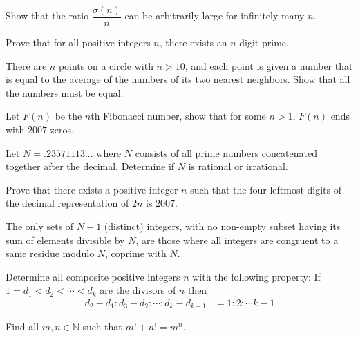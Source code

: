 \documentclass[problems.tex]{subfile}
\begin{document}
	\begin{problem}
		Show that the ratio $\dfrac{\sigma(n)}{n}$ can be arbitrarily large for infinitely many $n$\watermark.
	\end{problem}

	\begin{problem}
		Prove that for all positive integers $n$, there exists an $n$-digit prime.
	\end{problem}
	
	\begin{problem}
		There are $n$ points on a circle with $n>10$, and each point is given a number that is equal to the average of the numbers of its two nearest neighbors. Show that all the numbers must be equal.
	\end{problem}
	
	\begin{problem}
		Let $F(n)$ be the $n$th Fibonacci number, show that for some $n>1$, $F(n)$ ends with $2007$ zeros.
	\end{problem}
	
	\begin{problem}
		Let $N=.23571113...$ where $N$ consists of all prime numbers concatenated together after the decimal. Determine if $N$ is rational or irrational.
	\end{problem}
	
	\begin{problem}
		Prove that there exists a positive integer $n$ such that the four leftmost digits of the decimal representation of $2n$ is $2007$.
	\end{problem}
	
	\begin{problem}
		The only sets of $N-1$ (distinct) integers, with no non-empty subset having its sum of elements divisible by $N$, are those where all integers are congruent to a same residue modulo $N$, coprime with $N$.
	\end{problem}
	
	\begin{problem}
		Determine all composite positive integers $n$ with the following property: If $1=d_1<d_2<\cdots<d_k$ are the divisors of $n$ then
			\begin{align*}
				d_2-d_1:d_3-d_2:\cdots:d_k-d_{k-1} & = 1:2:\cdots k-1
			\end{align*}
	\end{problem}
	
	\begin{problem}[Belarus $2009$]
		Find all $m,n\in\mathbb{N}$ such that $m!+n!=m^n$.
	\end{problem}
	
\end{document}
